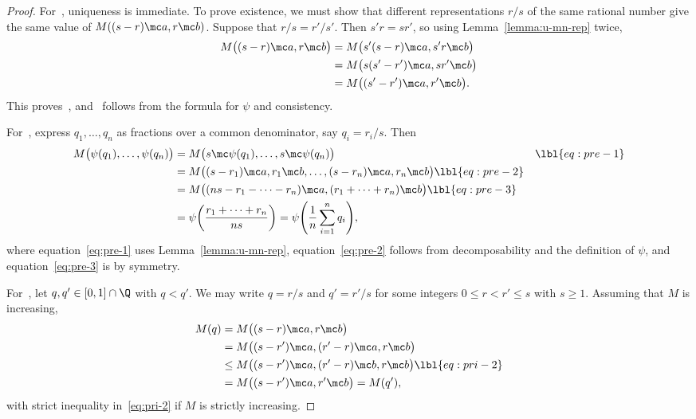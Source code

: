 \begin{proof}
For~, uniqueness is immediate.  To prove existence,
we must show that different representations $r/s$ of the same rational
number give the same value of $M((s - r) \mc a, r \mc b)$.  Suppose that
$r/s = r'/s'$.  Then $s'r = sr'$, so using Lemma~\ref{lemma:u-mn-rep}
twice,
% 
\begin{align*}
M\bigl((s - r) \mc a, r \mc b\bigr)       &
=
M\bigl(s'(s - r) \mc a, s'r \mc b\bigr)  \\
&
=
M\bigl(s(s' - r') \mc a, sr' \mc b\bigr) \\
&
=
M\bigl((s' - r') \mc a, r' \mc b\bigr).
\end{align*}
% 
This proves~, and~ follows
from the formula for $\psi$ and consistency.

For~, express $q_1, \ldots, q_n$ as fractions
over a common denominator, say $q_i = r_i/s$.  Then 
% 
\begin{align}
M\bigl(
\psi(q_1), \ldots, \psi(q_n)
\bigr)  &
=
M\bigl(
s \mc \psi(q_1), \ldots, s \mc \psi(q_n)
\bigr)  &
\lbl{eq:pre-1}        \\
&
=
M\bigl(
(s - r_1) \mc a, r_1 \mc b, \ldots, (s - r_n) \mc a, r_n \mc b
\bigr)  
\lbl{eq:pre-2}        \\
&
=
M\bigl(
(ns - r_1 - \cdots - r_n) \mc a, (r_1 + \cdots + r_n) \mc b
\bigr)  
\lbl{eq:pre-3}
\\
&
=
\psi\biggl( \frac{r_1 + \cdots + r_n}{ns} \biggr)
=
\psi \Biggl( \frac{1}{n} \sum_{i = 1}^n q_i \Biggr),
\nonumber
\end{align}
% 
where equation~\eqref{eq:pre-1} uses Lemma~\ref{lemma:u-mn-rep},
equation~\eqref{eq:pre-2} follows from decomposability and the definition
of $\psi$, and equation~\eqref{eq:pre-3} is by symmetry.

For~, let $q, q' \in [0, 1] \cap \Q$ with $q < q'$.
We may write $q = r/s$ and $q' = r'/s$ for some integers $0 \leq r < r'
\leq s$ with $s \geq 1$.  Assuming that $M$ is increasing, 
% 
\begin{align}
M(q)    &
=
M\bigl((s - r) \mc a, r \mc b\bigr)     
\nonumber       \\
&
=
M\bigl((s - r') \mc a, (r' - r) \mc a, r \mc b\bigr)       
\nonumber       \\
&
\leq
M\bigl((s - r') \mc a, (r' - r) \mc b, r \mc b\bigr)       
\lbl{eq:pri-2}  \\
&
=
M\bigl((s - r') \mc a, r' \mc b\bigr)
=
M(q'),
\nonumber
\end{align}
%
with strict inequality in~\eqref{eq:pri-2} if $M$ is strictly increasing. 
\end{proof}

